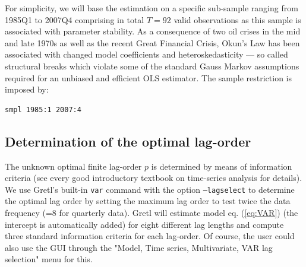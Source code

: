 \documentclass[11pt]{article}
\begin{document}
%

For simplicity, we will base the estimation on a specific sub-sample ranging from 1985Q1 to 2007Q4 comprising in total $ T=92 $ valid observations as this sample is associated with parameter stability. As a consequence of two oil crises in the mid and late 1970s as well as the recent Great Financial Crisis, Okun's Law has been associated with changed model coefficients and heteroskedasticity --- so called structural breaks which violate some of the standard Gauss Markov assumptions required for an unbiased and efficient OLS estimator. The sample restriction is imposed by:
\begin{Verbatim}[baselinestretch=0.75, fontsize=\small]
smpl 1985:1 2007:4
\end{Verbatim}

\subsection{Determination of the optimal lag-order}
The unknown optimal finite lag-order $ p $ is determined by means of information criteria (see every good introductory textbook on time-series analysis for details). We use Gretl's built-in \texttt{var} command with the option \texttt{---lagselect} to determine the optimal lag order by setting the maximum lag order to test twice the data frequency (=8 for quarterly data). Gretl will estimate model eq. (\ref{eq:VAR}) (the intercept is automatically added) for eight different lag lengths and compute three standard information criteria for each lag-order. Of course, the user could also use the GUI through the "Model, Time series, Multivariate, VAR lag selection" menu for this.
\end{document}
